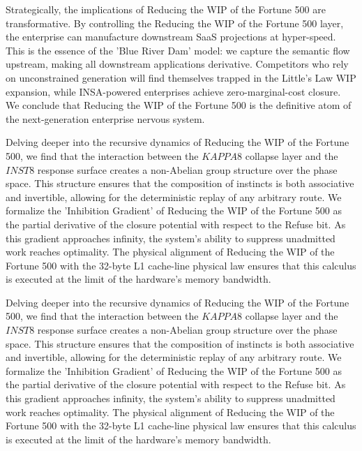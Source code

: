 \documentclass[12pt,a4paper,oneside]{book}
\begin{document}
Strategically, the implications of Reducing the WIP of the Fortune 500 are transformative. By controlling the Reducing the WIP of the Fortune 500 layer, the enterprise can manufacture downstream SaaS projections at hyper-speed. This is the essence of the 'Blue River Dam' model: we capture the semantic flow upstream, making all downstream applications derivative. Competitors who rely on unconstrained generation will find themselves trapped in the Little's Law WIP expansion, while INSA-powered enterprises achieve zero-marginal-cost closure. We conclude that Reducing the WIP of the Fortune 500 is the definitive atom of the next-generation enterprise nervous system. 

Delving deeper into the recursive dynamics of Reducing the WIP of the Fortune 500, we find that the interaction between the $KAPPA8$ collapse layer and the $INST8$ response surface creates a non-Abelian group structure over the phase space. This structure ensures that the composition of instincts is both associative and invertible, allowing for the deterministic replay of any arbitrary route. We formalize the 'Inhibition Gradient' of Reducing the WIP of the Fortune 500 as the partial derivative of the closure potential with respect to the Refuse bit. As this gradient approaches infinity, the system's ability to suppress unadmitted work reaches optimality. The physical alignment of Reducing the WIP of the Fortune 500 with the 32-byte L1 cache-line physical law ensures that this calculus is executed at the limit of the hardware's memory bandwidth. 

Delving deeper into the recursive dynamics of Reducing the WIP of the Fortune 500, we find that the interaction between the $KAPPA8$ collapse layer and the $INST8$ response surface creates a non-Abelian group structure over the phase space. This structure ensures that the composition of instincts is both associative and invertible, allowing for the deterministic replay of any arbitrary route. We formalize the 'Inhibition Gradient' of Reducing the WIP of the Fortune 500 as the partial derivative of the closure potential with respect to the Refuse bit. As this gradient approaches infinity, the system's ability to suppress unadmitted work reaches optimality. The physical alignment of Reducing the WIP of the Fortune 500 with the 32-byte L1 cache-line physical law ensures that this calculus is executed at the limit of the hardware's memory bandwidth. 
\end{document}
